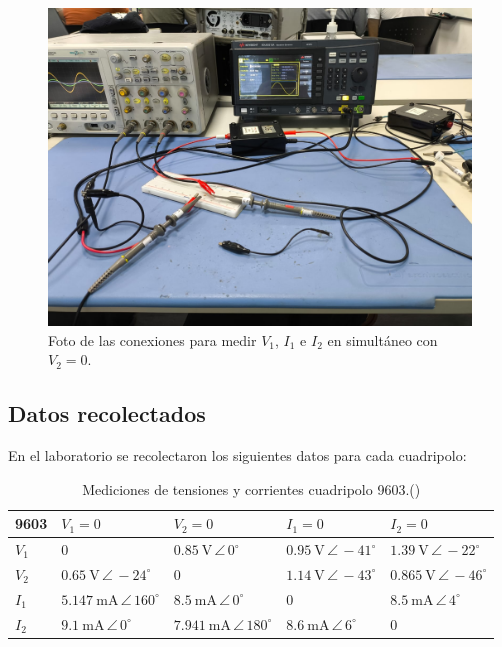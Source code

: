     \begin{figure}[H]
        \centering
        \includegraphics[width=0.5\linewidth]{V2=0.png}
    \caption{Foto de las conexiones para medir $ V_1 $, $ I_1 $ e $ I_2 $ en simultáneo con $ V_2 = 0 $.}
    \label{fig: fotoConexionesOsciloscopio}
    \end{figure}

    \subsection{Datos recolectados}
    
    En el laboratorio se recolectaron los siguientes datos para cada cuadripolo:
    
   \begin{table}[H]
\centering
\begin{tabular}{|l|l|l|l|l|}
\hline
\textbf{9603} & $V_1=0$ & $V_2=0$ & $I_1=0$ & $I_2=0$ \\ \hline 
$V_1$ & $0$ & $0.85\ \mathrm{V}\,\angle\,0^\circ$ & $0.95\ \mathrm{V}\,\angle\,-41^\circ$ & $1.39\ \mathrm{V}\,\angle\,-22^\circ$ \\ \hline
$V_2$ & $0.65\ \mathrm{V}\,\angle\,-24^\circ$ & $0$ & $1.14\ \mathrm{V}\,\angle\,-43^\circ$ & $0.865\ \mathrm{V}\,\angle\,-46^\circ$ \\ \hline
$I_1$ & $5.147\ \mathrm{mA}\,\angle\,160^\circ$ & $8.5\ \mathrm{mA}\,\angle\,0^\circ$ & $0$ & $8.5\ \mathrm{mA}\,\angle\,4^\circ$ \\ \hline
$I_2$ & $9.1\ \mathrm{mA}\,\angle\,0^\circ$ & $7.941\ \mathrm{mA}\,\angle\,180^\circ$ & $8.6\ \mathrm{mA}\,\angle\,6^\circ$ & $0$ \\ \hline
\end{tabular}
\caption{Mediciones de tensiones y corrientes cuadripolo 9603.()}
\label{tab:mediciones9603}
\end{table}

